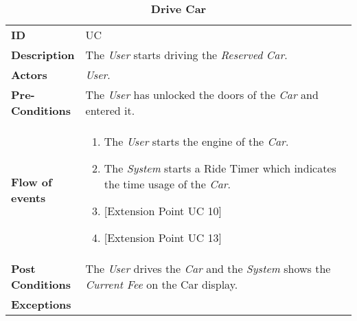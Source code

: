 \begin{longtable}{|p{0.2\linewidth} | p{0.8\linewidth}|}
	\captionsetup{labelformat=empty} %
	\caption{\textbf{Drive Car}} %
	\label{UC_DriveCar}%
	\\ \hline %
	
	\textbf{ID} & UC\theUseCaseIdCounter \\ \hline
	\textbf{Description} & The \emph{User} starts driving the \emph{Reserved} \emph{Car}. \\ \hline
	\textbf{Actors} & \emph{User}.\\ \hline
	\textbf{Pre-Conditions} & The \emph{User} has unlocked the doors of the \emph{Car} and entered it. \\ \hline
	\textbf{Flow of events} & 
	\begin{enumerate}
		\item The \emph{User} starts the engine of the \emph{Car}.
		\item The \emph{System} starts a Ride Timer which indicates the time usage of the \emph{Car}.
		\item {[}Extension Point UC 10{]}
		\item {[}Extension Point UC 13{]}
	\end{enumerate}	 \\ \hline
	\textbf{Post Conditions} & The \emph{User} drives the \emph{Car} and the \emph{System} shows the \emph{Current Fee} on the Car display.\\ \hline
	\textbf{Exceptions} & \\ \hline
\end{longtable}

